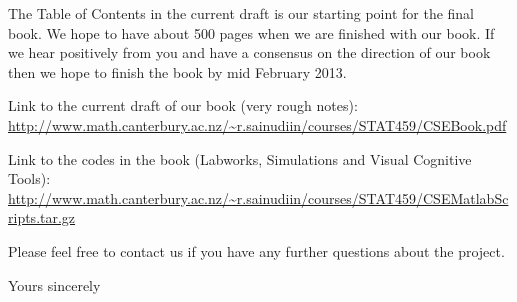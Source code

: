 \documentclass[a4paper]{letter}
\begin{document}
\begin{letter}{}
The Table of Contents in the current draft is our starting point for the final book.  
We hope to have about 500 pages when we are finished with our book.  
If we hear positively from you and have a consensus on the direction of our book then we hope to finish the book by mid February 2013.

Link to the current draft of our book (very rough notes):\\
\url{http://www.math.canterbury.ac.nz/~r.sainudiin/courses/STAT459/CSEBook.pdf}

Link to the \Matlab codes in the book (Labworks, Simulations and Visual Cognitive Tools):\\
\url{http://www.math.canterbury.ac.nz/~r.sainudiin/courses/STAT459/CSEMatlabScripts.tar.gz}


Please feel free to contact us if you have any further questions about the project.

\closing{Yours sincerely}


\vspace{1.5cm}

\end{letter}
\end{document}
